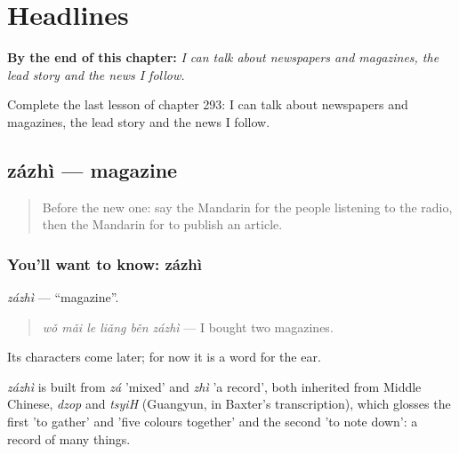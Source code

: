 
\chapter{Headlines}
\label{ch:zh-headlines}

\begin{chapteropening}
\textbf{By the end of this chapter:} \emph{I can talk about newspapers and magazines, the lead story and the news I follow.}

Complete the last lesson of chapter 293: I can talk about newspapers and magazines, the lead story and the news I follow.
\end{chapteropening}

\section[zázhì]{zázhì — magazine}

\label{lesson:ZH-C293-zazhi}



\begin{quote}
Before the new one: say the Mandarin for the people listening to the radio, then the Mandarin for to publish an article.
\end{quote}

\subsection*{You'll want to know: zázhì}
\emph{zázhì} — \textquotedblleft{}magazine\textquotedblright{}.

\begin{quote}
\emph{wǒ mǎi le liǎng běn zázhì} — I bought two magazines.
\end{quote}

Its characters come later; for now it is a word for the ear.

\begin{cousinweb}
\emph{zázhì} is built from \emph{zá} 'mixed' and \emph{zhì} 'a record', both inherited from Middle Chinese, \emph{dzop} and \emph{tsyiH} (Guangyun, in Baxter's transcription), which glosses the first 'to gather' and 'five colours together' and the second 'to note down': a record of many things.
\end{cousinweb}


